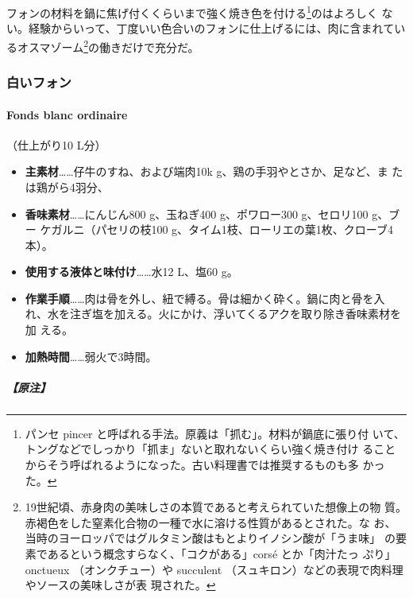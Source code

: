 \begin{recette}
フォンの材料を鍋に焦げ付くくらいまで強く焼き色を付ける\footnote{パンセ
  pincer と呼ばれる手法。原義は「抓む」。材料が鍋底に張り付
  いて、トングなどでしっかり「抓ま」ないと取れないくらい強く焼き付け
  ることからそう呼ばれるようになった。古い料理書では推奨するものも多
  かった。}のはよろしく
ない。経験からいって、丁度いい色合いのフォンに仕上げるには、肉に含まれてい
るオスマゾーム\footnote{19世紀頃、赤身肉の美味しさの本質であると考えられていた想像上の物
  質。赤褐色をした窒素化合物の一種で水に溶ける性質があるとされた。な
  お、当時のヨーロッパではグルタミン酸はもとよりイノシン酸が「うま味」
  の要素であるという概念すらなく、「コクがある」corsé とか「肉汁たっ
  ぷり」onctueux （オンクチュー）や succulent
  （スュキロン）などの表現で肉料理やソースの美味しさが表 現された。}の働きだけで充分だ。

\maeaki

\hypertarget{fondsblanc}{%
\subsubsection{白いフォン}\label{fondsblanc}}

\hypertarget{fonds-blanc}{%
\paragraph{Fonds blanc ordinaire}\label{fonds-blanc}}


（仕上がり10 L分）

\begin{itemize}
\item
  \textbf{主素材}\ldots{}\ldots{}仔牛のすね、および端肉10k
  g、鶏の手羽やとさか、足など、ま たは鶏がら4羽分、
\item
  \textbf{香味素材}\ldots{}\ldots{}にんじん800 g、玉ねぎ400
  g、ポワロー300 g、セロリ100 g、ブー ケガルニ（パセリの枝100
  g、タイム1枝、ローリエの葉1枚、クローブ4本）。
\item
  \textbf{使用する液体と味付け}\ldots{}\ldots{}水12 L、塩60 g。
\item
  \textbf{作業手順}\ldots{}\ldots{}肉は骨を外し、紐で縛る。骨は細かく砕く。鍋に肉と骨を入
  れ、水を注ぎ塩を加える。火にかけ、浮いてくるアクを取り除き香味素材を加
  える。
\item
  \textbf{加熱時間}\ldots{}\ldots{}弱火で3時間。
\end{itemize}

\hypertarget{nota-fonds-blanc}{%
\subparagraph{【原注】}\label{nota-fonds-blanc}}


\end{recette}
